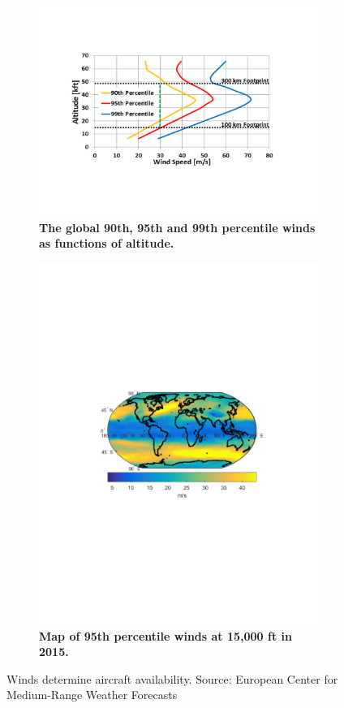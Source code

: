 \documentclass[journal]{aiaa-tc}%
\begin{document}
\begin{figure}[h!]
\begin{center}
\begin{subfigure}{0.45\textwidth}
    \includegraphics[width = .9\textwidth]{wind_profiles}
    \caption{ \textbf{The global 90th, 95th and 99th percentile winds as functions of altitude.} }
    \label{f:wind_profiles}
\end{subfigure}
\begin{subfigure}{0.45\textwidth}
\includegraphics[width = .8\textwidth]{wind_map}
    \caption{ \textbf{Map of 95th percentile winds at 15,000 ft in 2015.} }
    \label{f:wind_map}
\end{subfigure}
\end{center}
\caption{Winds determine aircraft availability. Source: European Center for Medium-Range Weather Forecasts}
\label{f:winds&availability}
\end{figure}
\end{document}
